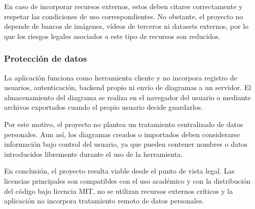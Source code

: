 En caso de incorporar recursos externos, estos deben citarse correctamente y respetar las condiciones de uso correspondientes. No obstante, el proyecto no depende de bancos de imágenes, vídeos de terceros ni datasets externos, por lo que los riesgos legales asociados a este tipo de recursos son reducidos.

\subsubsection{Protección de datos}

La aplicación funciona como herramienta cliente y no incorpora registro de usuarios, autenticación, backend propio ni envío de diagramas a un servidor. El almacenamiento del diagrama se realiza en el navegador del usuario o mediante archivos exportados cuando el propio usuario decide guardarlos.

Por este motivo, el proyecto no plantea un tratamiento centralizado de datos personales. Aun así, los diagramas creados o importados deben considerarse información bajo control del usuario, ya que pueden contener nombres o datos introducidos libremente durante el uso de la herramienta.

En conclusión, el proyecto resulta viable desde el punto de vista legal. Las licencias principales son compatibles con el uso académico y con la distribución del código bajo licencia MIT, no se utilizan recursos externos críticos y la aplicación no incorpora tratamiento remoto de datos personales.
